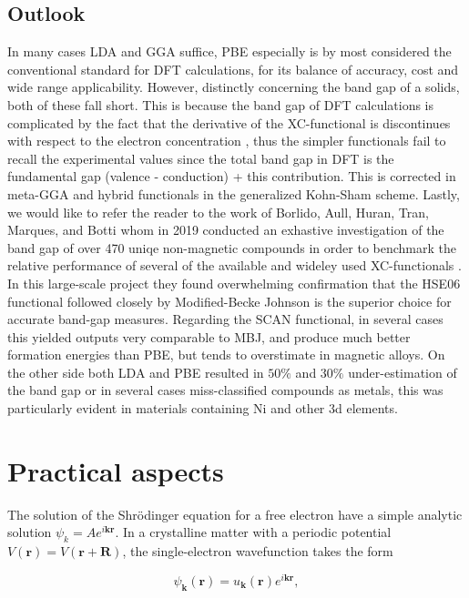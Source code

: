 \subsection{Outlook} 
 
In many cases LDA and GGA suffice, PBE especially is by most considered the conventional standard for DFT calculations, for its balance of accuracy, cost and wide range applicability. However, distinctly concerning the band gap of a solids, both of these fall short. This is because the band gap of DFT calculations is complicated by the fact that the derivative of the XC-functional is discontinues with respect to the electron concentration \cite{xc_derivative}, thus the simpler functionals fail to recall the experimental values since the total band gap in DFT is the fundamental gap (valence - conduction) + this contribution. This is corrected in meta-GGA and hybrid functionals in the generalized Kohn-Sham scheme. Lastly, we would like to refer the reader to the work of Borlido, Aull, Huran, Tran, Marques, and Botti whom in 2019 conducted an exhastive investigation of the band gap of over 470 uniqe non-magnetic compounds in order to benchmark the relative performance of several of the available and wideley used XC-functionals \cite{xc_benchmark}. In this large-scale project they found overwhelming confirmation that the HSE06 functional followed closely by Modified-Becke Johnson is the superior choice for accurate band-gap measures. Regarding the SCAN functional, in several cases this yielded outputs very comparable to MBJ, and produce much better formation energies than PBE, but tends to overstimate in magnetic alloys. On the other side both LDA and PBE resulted in $50\%$ and $30\%$ under-estimation of the band gap or in several cases miss-classified compounds as metals, this was particularly evident in materials containing Ni and other 3d elements.  
 

\section{Practical aspects}

The solution of the Shr\"{o}dinger equation for a free electron have a simple analytic solution $\psi_k = Ae^{i\boldsymbol{k}\boldsymbol{r}}$. In a crystalline matter with a periodic potential $V(\boldsymbol{r}) = V(\boldsymbol{r} + \boldsymbol{R})$, the single-electron wavefunction takes the form 

\begin{equation}
\psi_{\boldsymbol{k}}(\boldsymbol{r}) = u_{\boldsymbol{k}}(\boldsymbol{r})e^{i\boldsymbol{k}\boldsymbol{r}},    
\end{equation}


